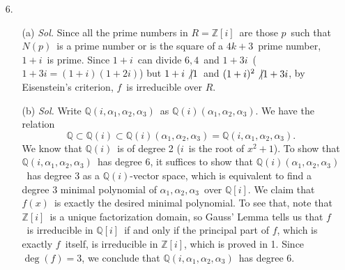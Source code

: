 \documentclass[12pt]{article}
\newcommand{\Z}{\mathbb{Z}}
\newcommand{\Q}{\mathbb{Q}}
\begin{document}
\begin{enumerate}
	\item[6.]
	\begin{enumerate}
		\item[(a)]
			\textit{Sol.} Since all the prime numbers in $R=\Z[i]$\ are those $p$\ such that $N(p)$\ is a prime number or is the square of a $4k+3$\ prime number, $1+i$\ is prime. Since $1+i$\ can divide $6,4$\ and $1+3i$\ ($1+3i=(1+i)(1+2i)$) but $1+i\not\vert1$\ and $(1+i)^2\not\vert1+3i$, by Eisenstein's criterion, $f$\ is irreducible over $R$.
		\item[(b)]
			\textit{Sol.} Write $\Q(i,\alpha_1,\alpha_2,\alpha_3)$\ as $\Q(i)(\alpha_1,\alpha_2,\alpha_3)$. We have the relation
			$$\Q\subset\Q(i)\subset\Q(i)(\alpha_1,\alpha_2,\alpha_3)=\Q(i,\alpha_1,\alpha_2,\alpha_3).$$
			We know that $\Q(i)$\ is of degree 2 ($i$\ is the root of $x^2+1$). To show that $\Q(i,\alpha_1,\alpha_2,\alpha_3)$\ has degree 6, it suffices to show that $\Q(i)(\alpha_1,\alpha_2,\alpha_3)$\ has degree 3 as a $\Q(i)$-vector space, which is equivalent to find a degree 3 minimal polynomial of $\alpha_1,\alpha_2,\alpha_3$\ over $\Q[i]$. We claim that $f(x)$\ is exactly the desired minimal polynomial. To see that, note that $\Z[i]$\ is a unique factorization domain, so Gauss' Lemma tells us that $f$\ is irreducible in $\Q[i]$\ if and only if the principal part of $f$, which is exactly $f$\ itself, is irreducible in $\Z[i]$, which is proved in 1. Since $\deg(f)=3$, we conclude that $\Q(i,\alpha_1,\alpha_2,\alpha_3)$\ has degree 6.
	\end{enumerate}
	
\end{enumerate}
\end{document}
